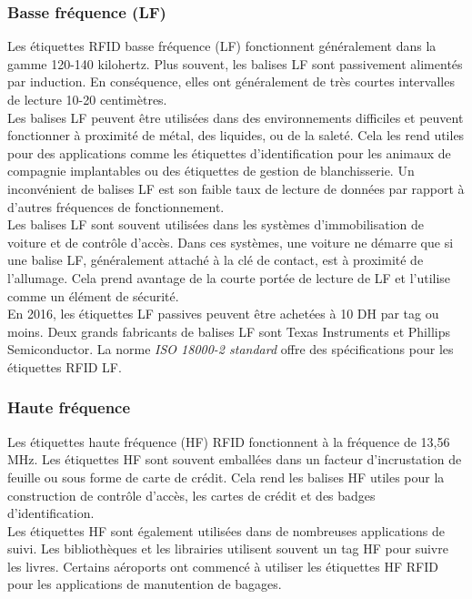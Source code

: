 \documentclass[11pt, a4paper, twoside]{book}
\begin{document}
\subsubsection{Basse fréquence (LF)}
Les étiquettes RFID basse fréquence (LF) fonctionnent généralement dans la gamme 120-140 kilohertz. Plus souvent, les balises LF sont passivement alimentés par induction. En conséquence, elles ont généralement de très courtes intervalles de lecture 10-20 centimètres.\\

Les balises LF peuvent être utilisées dans des environnements difficiles et peuvent fonctionner à proximité de métal, des liquides, ou de la saleté. Cela les rend utiles pour des applications comme les étiquettes d'identification pour les animaux de compagnie implantables ou des étiquettes de gestion de blanchisserie. Un inconvénient de balises LF est son faible taux de lecture de données par rapport à d'autres fréquences de fonctionnement.\\

Les balises LF sont souvent utilisées dans les systèmes d'immobilisation de voiture et de contrôle d'accès. Dans ces systèmes, une voiture ne démarre que si une balise LF, généralement attaché à la clé de contact, est à proximité de l'allumage. Cela prend avantage de la courte portée de lecture de LF et l'utilise comme un élément de sécurité.\\

En 2016, les étiquettes LF passives peuvent être achetées à 10 DH par tag ou moins. Deux grands fabricants de balises LF sont Texas Instruments et Phillips Semiconductor. La norme \emph{ISO 18000-2 standard} \cite{iso2} offre des spécifications pour les étiquettes RFID LF.

\subsubsection{Haute fréquence}
Les étiquettes haute fréquence (HF) RFID fonctionnent à la fréquence de 13,56 MHz. Les étiquettes HF sont souvent emballées dans un facteur d'incrustation de feuille ou sous forme de carte de crédit. Cela rend les balises HF utiles pour la construction de contrôle d'accès, les cartes de crédit et des badges d'identification.\\

Les étiquettes HF sont également utilisées dans de nombreuses applications de suivi. Les bibliothèques et les librairies utilisent souvent un tag HF pour suivre les livres. Certains aéroports ont commencé à utiliser les étiquettes HF RFID pour les applications de manutention de bagages.\\
\end{document}
